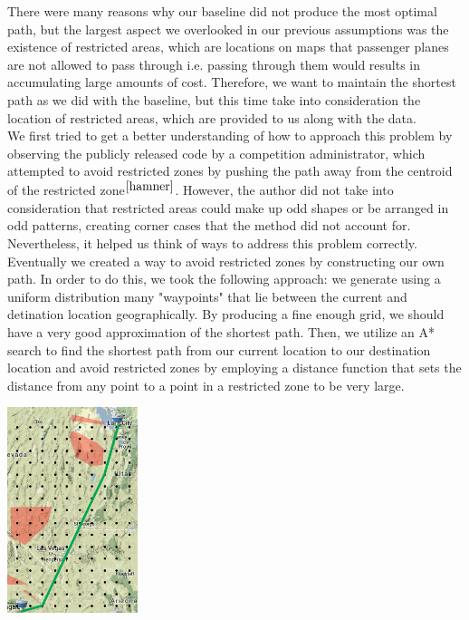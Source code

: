 \documentclass{article}[12pt]
\begin{document}
\begin{multicols}{2}
There were many reasons why our baseline did not produce the most optimal path, but the largest aspect we overlooked in our previous assumptions was the existence of restricted areas, which are locations on maps that passenger planes are not allowed to pass through i.e. passing through them would results in accumulating large amounts of cost. Therefore, we want to maintain the shortest path as we did with the baseline, but this time take into consideration the location of restricted areas, which are provided to us along with the data.\\

We first tried to get a better understanding of how to approach this problem by observing the publicly released code by a competition administrator, which attempted to avoid restricted zones by pushing the path away from the centroid of the restricted zone$^{\cite{hamner}}$. However, the author did not take into consideration that restricted areas could make up odd shapes or be arranged in odd patterns, creating corner cases that the method did not account for. Nevertheless, it helped us think of ways to address this problem correctly.\\

Eventually we created a way to avoid restricted zones by constructing our own path. In order to do this, we took the following approach: we generate using a uniform distribution many "waypoints" that lie between the current and detination location geographically. By producing a fine enough grid, we should have a very good approximation of the shortest path. Then, we utilize an A* search to find the shortest path from our current location to our destination location and avoid restricted zones by employing a distance function that sets the distance from any point to a point in a restricted zone to be very large.
\begingroup
  \begin{center}
    \includegraphics[width=1.5in]{astar.png}
	\end{center}
\endgroup


\end{multicols}
\end{document}
